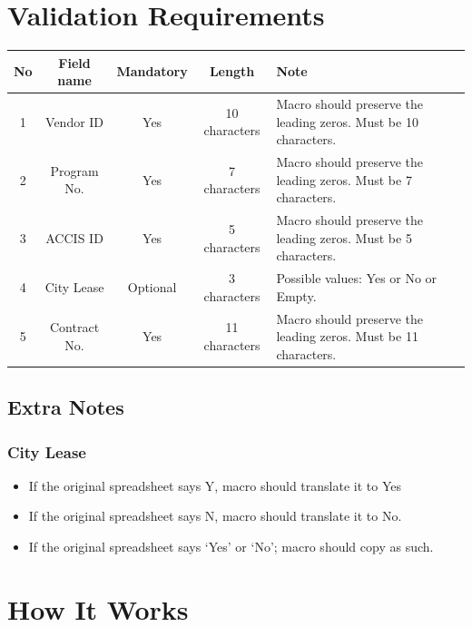 \documentclass[12pt,a4paper]{report}
\begin{document}
    \section{Validation Requirements}
        \begin{center}
        	\begin{tabular}{| c || c | c | c | p{4.5cm} |}
        	\hline
        	No & Field name & Mandatory & Length & Note \\ 
        	\hline
        	\hline
        	1 & Vendor ID &	Yes & 10 characters & Macro should preserve the leading zeros. Must be 10 characters. \\ 
        	\hline
        	2 & Program No. & Yes & 7 characters & Macro should preserve the leading zeros. Must be 7 characters. \\ 
        	\hline
        	3 & ACCIS ID & Yes & 5 characters & Macro should preserve the leading zeros. Must be 5 characters. \\ 
        	\hline
        	4 & City Lease & Optional & 3 characters & Possible values: Yes or No or Empty. \\
            \hline
        	5 & Contract No. & Yes & 11 characters & Macro should preserve the leading zeros. Must be 11 characters. \\ 
        	\hline
        	\end{tabular}
        \end{center}
    
        \subsection{Extra Notes}
        \subsubsection{City Lease}
        
        \begin{itemize}
        		\item If the original spreadsheet says Y, macro should translate it to Yes 
        		\item If the original spreadsheet says N, macro should translate it to No.
        		\item If the original spreadsheet says `Yes' or `No'; macro should copy as such. 
        	\end{itemize} 
        
    \section{How It Works}
    
\end{document}
